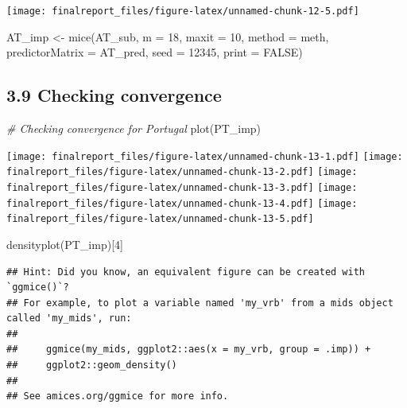 \documentclass[
]{article}
\newenvironment{Shaded}{\begin{snugshade}}{\end{snugshade}}
\newcommand{\AttributeTok}[1]{\textcolor[rgb]{0.77,0.63,0.00}{#1}}
\newcommand{\CommentTok}[1]{\textcolor[rgb]{0.56,0.35,0.01}{\textit{#1}}}
\newcommand{\ConstantTok}[1]{\textcolor[rgb]{0.00,0.00,0.00}{#1}}
\newcommand{\DecValTok}[1]{\textcolor[rgb]{0.00,0.00,0.81}{#1}}
\newcommand{\FunctionTok}[1]{\textcolor[rgb]{0.00,0.00,0.00}{#1}}
\newcommand{\NormalTok}[1]{#1}
\newcommand{\OtherTok}[1]{\textcolor[rgb]{0.56,0.35,0.01}{#1}}
\begin{document}
\texttt{[image: finalreport\_files/figure-latex/unnamed-chunk-12-5.pdf]}

\begin{Shaded}
\begin{Highlighting}[]
\NormalTok{AT\_imp }\OtherTok{\textless{}{-}} \FunctionTok{mice}\NormalTok{(AT\_sub,}
               \AttributeTok{m =} \DecValTok{18}\NormalTok{,}
               \AttributeTok{maxit =} \DecValTok{10}\NormalTok{, }
               \AttributeTok{method =}\NormalTok{ meth,}
               \AttributeTok{predictorMatrix =}\NormalTok{ AT\_pred,}
               \AttributeTok{seed =} \DecValTok{12345}\NormalTok{,}
               \AttributeTok{print =} \ConstantTok{FALSE}\NormalTok{)}
\end{Highlighting}
\end{Shaded}

\hypertarget{checking-convergence}{%
\subsection{3.9 Checking convergence}\label{checking-convergence}}

\begin{Shaded}
\begin{Highlighting}[]
\CommentTok{\# Checking convergence for Portugal}
\FunctionTok{plot}\NormalTok{(PT\_imp)}
\end{Highlighting}
\end{Shaded}

\texttt{[image: finalreport\_files/figure-latex/unnamed-chunk-13-1.pdf]}
\texttt{[image: finalreport\_files/figure-latex/unnamed-chunk-13-2.pdf]}
\texttt{[image: finalreport\_files/figure-latex/unnamed-chunk-13-3.pdf]}
\texttt{[image: finalreport\_files/figure-latex/unnamed-chunk-13-4.pdf]}
\texttt{[image: finalreport\_files/figure-latex/unnamed-chunk-13-5.pdf]}

\begin{Shaded}
\begin{Highlighting}[]
\FunctionTok{densityplot}\NormalTok{(PT\_imp)[}\DecValTok{4}\NormalTok{]}
\end{Highlighting}
\end{Shaded}

\begin{verbatim}
## Hint: Did you know, an equivalent figure can be created with `ggmice()`?
## For example, to plot a variable named 'my_vrb' from a mids object called 'my_mids', run: 
## 
##     ggmice(my_mids, ggplot2::aes(x = my_vrb, group = .imp)) +
##     ggplot2::geom_density() 
## 
## See amices.org/ggmice for more info.
\end{verbatim}
\end{document}
